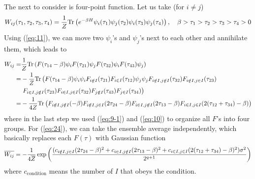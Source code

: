 \documentclass[11pt]{article}
\renewcommand{\>}{\rangle}
\newcommand{\<}{\langle}
\begin{document}
The next to consider is four-point function. Let us take (for $i\neq j$)
\begin{equation}
W_{ij}(\tau_{1},\tau_{2},\tau_{3},\tau_{4})=\frac{1}{Z}\text{Tr}\left(e^{-\beta H}\psi_{i}(\tau_{1})\psi_{j}(\tau_{2})\psi_{i}(\tau_{3})\psi_{j}(\tau_{4})\right),\quad\beta>\tau_{1}>\tau_{2}>\tau_{3}>\tau_{4}>0
\end{equation}
Using (\ref{eq:11}), we can move two $\psi_{i}$'s and $\psi_{j}$'s
next to each other and annihilate them, which leads to 
\begin{align}
 W_{ij}= & \frac{1}{Z}\text{Tr}\left(F(\tau_{14}-\beta)\psi_{i}F(\tau_{21})\psi_{j}F(\tau_{32})\psi_{i}F(\tau_{43})\psi_{j}\right)\nonumber \\
= & -\frac{1}{Z}\text{Tr}\left(F(\tau_{14}-\beta)\psi_{i}\psi_{i}F_{i\notin I}(\tau_{21})F_{i\in I}(\tau_{12})\psi_{j}\psi_{j}F_{i\notin I,j\notin I}(\tau_{32})F_{i\notin I,j\in I}(\tau_{23})\right.\nonumber \\
 & \left.F_{i\in I,j\notin I}(\tau_{23})F_{i\in I,j\in I}(\tau_{32})F_{j\notin I}(\tau_{43})F_{j\in I}(\tau_{34})\right)\nonumber \\
= & -\frac{1}{4Z}\text{Tr}\left(F_{i\notin I,j\notin I}(-\beta)F_{i\notin I,j\in I}(2\tau_{24}-\beta)F_{i\in I,j\notin I}(2\tau_{13}-\beta)F_{i\in I,j\in I}(2(\tau_{12}+\tau_{34})-\beta)\right)\label{eq:24}
\end{align}
where in the last step we used (\ref{eq:9-1}) and (\ref{eq:10})
to organize all $F$'s into four groups. For (\ref{eq:24}), we can
take the ensemble average independently, which basically replaces
each $F(\tau)$ with Gaussian function
\begin{equation}
\overline{W_{ij}}=-\frac{1}{4\overline{Z}}\exp\left(\frac{(c_{i\notin I,j\in I}(2\tau_{24}-\beta)^{2}+c_{i\in I,j\notin I}(2\tau_{13}-\beta)^{2}+c_{i\in I,j\in I}(2(\tau_{12}+\tau_{34})-\beta)^{2})\sigma^{2}}{2^{q+1}}\right)
\end{equation}
where $c_{\text{condition}}$ means the number of $I$ that obeys
the condition. 
\end{document}
